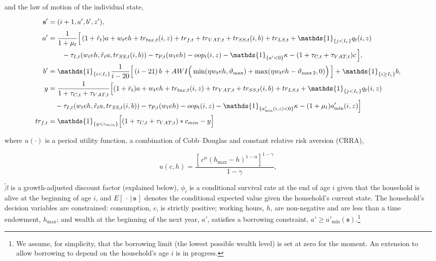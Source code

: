 \documentclass[11pt,leqno,fleqn]{article}
\newcommand{\be}{\vspace{-1em}\begin{singlespace}\begin{equation}}
\newcommand{\ee}{\end{equation}\end{singlespace}}
\newcommand{\ind}{\mathds{1}}
\begin{document}
and the law of motion of the individual state,
\begin{align}
	\mathbf{s}'&=(i+1,a',b',z'),\Bigr.\\
	a'&=\frac{1}{1+\mu_t}\Bigl[\,(1+\tilde{r}_{t})a+w_{t}eh+tr_{tax,t}(i,z)+tr_{f,t}+tr_{VAT,t}+tr_{SS,t}(i,b)
	+tr_{LS,t}+\ind_{\{j<I_r\}}q_{t}(i,z) \label{E:a_prime}\\
	&\qquad -\tau_{I,t}(w_{t}eh,\tilde{r}_{t}a,tr_{SS,t}(i,b))-\tau_{P,t}(w_{t}eh)-oop_{t}(i,z) - \ind_{\{a'<0\}}\kappa-(1+\tau_{C,t}+\tau_{VAT,t})c\,\Bigr],  \notag\\
	b'&=\ind_{\{i<I_{c}\}}\frac{1}{i-20}\Bigl[\,(i-21)\,b\,
	+AWI\Big(\min(\eta w_{t}eh,\vartheta_{\max})+\max(\eta w_{t}eh-\vartheta_{\max 2},0)\Big)\,\Bigr]
	+\ind_{\{i\geq I_{c}\}}b,\label{E:b_prime} \\
	y &= \frac{1}{1+\tau_{C,t}+\tau_{VAT,t}}\Big[(1+\tilde{r}_{t})a+w_{t}eh+tr_{tax,t}(i,z)+tr_{VAT,t}+tr_{SS,t}(i,b)
	+tr_{LS,t}+\ind_{\{j<I_r\}}q_{t}(i,z) \label{E:y}\\
	&\quad -\tau_{I,t}(w_{t}eh,\tilde{r}_{t}a,tr_{SS,t}(i,b))-\tau_{P,t}(w_{t}eh)-oop_{t}(i,z) - \ind_{\{a'_{\min}(i,z)<0\}}\kappa-(1+\mu_t)a'_{\min}(i,z)\Big] \notag \\
	tr_{f,t}&=\ind_{\{y<c_{min}\}}\Big[(1+\tau_{C,t}+\tau_{VAT,t})*c_{min} - y\Big]
\end{align}

where $u(\cdot)$ is a period utility function, a combination of Cobb--Douglas and constant relative risk aversion (CRRA),

\be u(c,h)=\frac{\left[\,c^{\alpha}(h_{\max}-h)^{1-\alpha}\right]^{1-\gamma}}{1-\gamma},\label{E:utl_fun} \ee

$\tilde{\beta}$ is a growth-adjusted discount factor (explained below), $\phi_{i}$ is a conditional survival rate at the end of age $i$ given that the household is alive at the beginning of age $i$, and $E[\,\cdot\,|\,\mathbf{s}\,]$ denotes the conditional expected value given the household's current state. The household's decision variables are constrained: consumption, $c$, is strictly positive; working hours, $h$, are non-negative and are less than a time endowment, $h_{\max}$; and wealth at the beginning of the next year, $a'$, satisfies a borrowing constraint, $a'\geq a'_{\min}(\mathbf{s})$.\footnote{We assume, for simplicity, that the borrowing limit (the lowest possible wealth level) is set at zero for the moment. An extension to allow borrowing to depend on the household's age $i$ is in progress.}
\end{document}
